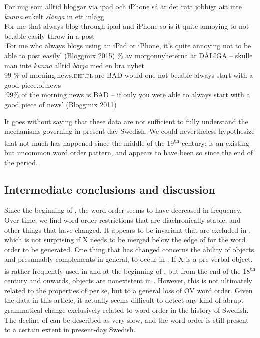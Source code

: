 \documentclass[output=paper, colorlinks, citecolor=brown]{langscibook}
\begin{document}
\ea {}\label{ex:sangfelt:27}
\ea\label{ex:sangfelt:27a}
\gll För mig som alltid bloggar via ipad och iPhone så är det rätt jobbigt att inte \textit{kunna} {enkelt} \textit{slänga} in ett inlägg\\
 For me that always blog through ipad and iPhone so is it quite annoying to not be.able easily throw in a post\\
\glt ‘For me who always blogs using an iPad or iPhone, it’s quite annoying not to be able to post easily’ (Bloggmix 2015)
\ex \label{ex:sangfelt:27b} \% av morgonnyheterna är DÅLIGA – skulle man inte \textit{kunna} {alltid} \textit{börja} med en bra nyhet \\
                                99 \% of morning.news.\textsc{def.pl} are BAD {} would one not be.able always start with a good piece.of.news \\
\glt ‘99\% of the morning news is BAD – if only you were able to always start with a good piece of news’ (Bloggmix 2011)\\
\z 
\z 

It goes without saying that these data are not sufficient to fully understand the mechanisms governing  in present-day Swedish. We could nevertheless hypothesize that not much has happened since the middle of the 19\textsuperscript{th} century;  is an existing but uncommon word order pattern, and appears to have been so since the end of the  period.

\subsection{Intermediate conclusions and discussion}\label{sec:sangfelt:4.4}
Since the beginning of , the  word order seems to have decreased in frequency. Over time, we find word order restrictions that are diachronically stable, and other things that have changed. It appears to be invariant that  are excluded in , which is not surprising if X needs to be merged below the edge of  for the word order to be generated. One thing that has changed concerns the ability of objects, and presumably complements in general, to occur in . If X is a pre-verbal object,  is rather frequently used in  and at the beginning of , but from the end of the 18\textsuperscript{th} century and onwards, objects are nonexistent in . However, this is not ultimately related to the properties of  per se, but to a general loss of OV word order. Given the data in this article, it actually seems difficult to detect any kind of abrupt grammatical change exclusively related to  word order in the history of Swedish. The decline of  can be described as very slow, and the word order is still present to a certain extent in present-day Swedish.
\end{document}
